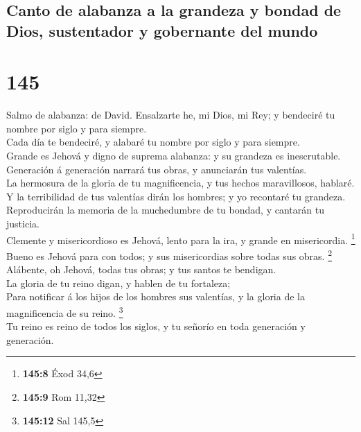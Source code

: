 \hypertarget{canto-de-alabanza-a-la-grandeza-y-bondad-de-dios-sustentador-y-gobernante-del-mundo}{%
\subsection{Canto de alabanza a la grandeza y bondad de Dios,
sustentador y gobernante del
mundo}\label{canto-de-alabanza-a-la-grandeza-y-bondad-de-dios-sustentador-y-gobernante-del-mundo}}

\hypertarget{section-144}{%
\section{145}\label{section-144}}

 Salmo de alabanza: de David. Ensalzarte he, mi Dios, mi
Rey; y bendeciré tu nombre por siglo y para siempre.\\
 Cada día te bendeciré, y alabaré tu nombre por siglo y
para siempre.\\
 Grande es Jehová y digno de suprema alabanza: y su
grandeza es inescrutable.\\
 Generación á generación narrará tus obras, y anunciarán
tus valentías.\\
 La hermosura de la gloria de tu magnificencia, y tus
hechos maravillosos, hablaré.\\
 Y la terribilidad de tus valentías dirán los hombres; y
yo recontaré tu grandeza.\\
 Reproducirán la memoria de la muchedumbre de tu bondad, y
cantarán tu justicia.\\
 Clemente y misericordioso es Jehová, lento para la ira, y
grande en misericordia. \footnote{\textbf{145:8} Éxod 34,6}\\
 Bueno es Jehová para con todos; y sus misericordias sobre
todas sus obras. \footnote{\textbf{145:9} Rom 11,32}\\
 Alábente, oh Jehová, todas tus obras; y tus santos te
bendigan.\\
 La gloria de tu reino digan, y hablen de tu fortaleza;\\
 Para notificar á los hijos de los hombres sus valentías,
y la gloria de la magnificencia de su reino. \footnote{\textbf{145:12}
  Sal 145,5}\\
 Tu reino es reino de todos los siglos, y tu señorío en
toda generación y generación.\\
